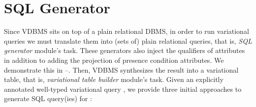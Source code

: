 \section{SQL Generator}
\label{sec:apps}


%
Since VDBMS sits on top of a plain relational DBMS, in order to run
variational queries we must translate them into (sets of) plain relational queries,
that is, \emph{SQL generator} module's task.
These generators also inject the qualifiers of attributes in addition to 
adding the projection of presence condition attributes. We demonstrate this
in --.
Then, VDBMS synthesizes the result into a variational table, that is, 
\emph{variational table builder} module's task.
%
Given an explicitly annotated well-typed variational query \vQ,
we provide three initial 
approaches to generate SQL query(ies) for \vQ:
